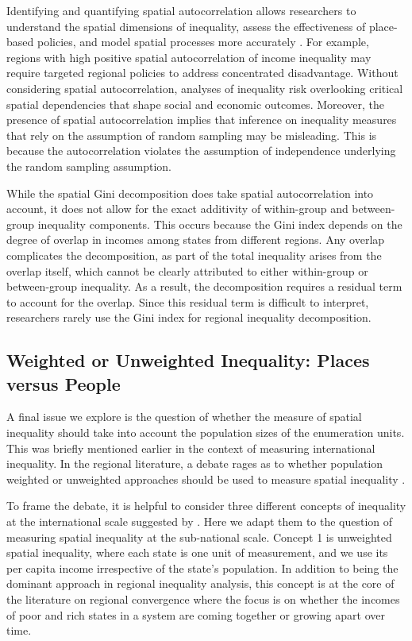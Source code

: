 \documentclass[
  a4paper, 
  twoside,
  final
]{article}
\begin{document}
Identifying and quantifying spatial autocorrelation allows researchers
to understand the spatial dimensions of inequality, assess the
effectiveness of place-based policies, and model spatial processes more
accurately \citep{anselin1995LocalIndicators}. For example, regions with
high positive spatial autocorrelation of income inequality may require
targeted regional policies to address concentrated disadvantage. Without
considering spatial autocorrelation, analyses of inequality risk
overlooking critical spatial dependencies that shape social and economic
outcomes. Moreover, the presence of spatial autocorrelation implies that
inference on inequality measures that rely on the assumption of random
sampling may be misleading. This is because the autocorrelation violates
the assumption of independence underlying the random sampling
assumption.

While the spatial Gini decomposition does take spatial autocorrelation
into account, it does not allow for the exact additivity of within-group
and between-group inequality components. This occurs because the Gini
index depends on the degree of overlap in incomes among states from
different regions. Any overlap complicates the decomposition, as part of
the total inequality arises from the overlap itself, which cannot be
clearly attributed to either within-group or between-group inequality.
As a result, the decomposition requires a residual term to account for
the overlap. Since this residual term is difficult to interpret,
researchers rarely use the Gini index for regional inequality
decomposition.

\subsection{Weighted or Unweighted Inequality: Places versus
People}\label{weighted-or-unweighted-inequality-places-versus-people}

A final issue we explore is the question of whether the measure of
spatial inequality should take into account the population sizes of the
enumeration units. This was briefly mentioned earlier in the context of
measuring international inequality. In the regional literature, a debate
rages as to whether population weighted or unweighted approaches should
be used to measure spatial inequality
\citep{gluschenko2018MeasuringRegional} .

To frame the debate, it is helpful to consider three different concepts
of inequality at the international scale suggested by
\citet{milanovic2007WorldsApart}. Here we adapt them to the question of
measuring spatial inequality at the sub-national scale. Concept 1 is
unweighted spatial inequality, where each state is one unit of
measurement, and we use its per capita income irrespective of the
state's population. In addition to being the dominant approach in
regional inequality analysis, this concept is at the core of the
literature on regional convergence \citep{rey1999us} where the focus is
on whether the incomes of poor and rich states in a system are coming
together or growing apart over time.
\end{document}
